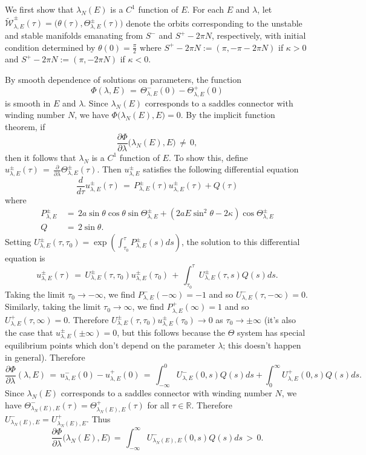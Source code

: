 \documentclass[11 pt]{article}
\renewcommand\l{\lambda}
\renewcommand\({\left(}
\renewcommand\){\right)}
\newcommand\wt{\widetilde}
\newcommand\<{\langle}
\renewcommand\>{\rangle}
\renewcommand\l{\lambda}
\newcommand\8{\infty}
\newcommand{\R}{\mathbb R}
\newcommand{\pd}{\partial}
\newcommand{\mc}{\mathcal}
\begin{document}
\proof  We first show that $\l_N(E)$ is a $C^1$ function of $E$. For each $E$ and $\l$, let $\wt{\mc{W}}_{\l,E}^\pm(\tau) = \big(\theta(\tau), \Theta^\pm_{\l,E}(\tau)\big)$ denote the orbits corresponding to the unstable and stable manifolds emanating from $S^-$ and $S^+ - 2\pi N$, respectively, with initial condition determined by $\theta(0) = \frac{\pi}{2}$ where $S^+ - 2\pi N := (\pi, - \pi - 2\pi N)$ if $\kappa > 0$ and $S^+ - 2\pi N := (\pi, -2\pi N)$ if $\kappa < 0$.

 By smooth dependence of solutions on parameters, the function 
\[
\Phi(\l,E) \,=\, \Theta^-_{\l,E}(0) - \Theta^+_{\l,E}(0)
\]
is smooth in $E$ and $\l$.  Since $\l_N(E)$ corresponds to a saddles connector with winding number $N$, we have $\Phi\big(\l_N(E),E\big) = 0$. By the implicit function theorem, if 
\[
\frac{\pd \Phi}{\pd \l}\big(\l_N(E),E\big) \,\neq\, 0,
\]
then it follows that $\l_N$ is a $C^1$ function of $E$. To show this, define $u^\pm_{\l,E}(\tau) \,=\, \frac{\pd}{\pd \l}\Theta^\pm_{\l,E}(\tau)$. Then $u^\pm_{\l,E}$ satisfies the following differential equation
\[
\frac{d}{d\tau}u^\pm_{\l,E}(\tau) \,=\, P^\pm_{\l,E}(\tau) u^\pm_{\l,E}(\tau) + Q(\tau)
\]
where
\begin{align*}
P^\pm_{\l,E} \,&=\, 2a\sin\theta \cos\theta \sin\Theta^\pm_{\l,E} + (2aE\sin^2\theta -2\kappa)\cos\Theta^\pm_{\l,E}
\\
Q \,&=\, 2\sin\theta.
\end{align*}
Setting $U^\pm_{\l,E}(\tau,\tau_0) = \exp(\int_{\tau_0}^\tau P^\pm_{\l,E}(s)ds )$, the solution to this differential equation is
\[
u^\pm_{\l,E}(\tau) \,=\, U^\pm_{\l,E}(\tau,\tau_0)u^\pm_{\l,E}(\tau_0) \,+\, \int_{\tau_0}^\tau U^\pm_{\l,E}(\tau,s)Q(s)ds. 
\]
Taking the limit $\tau_0 \to - \infty$, we find $P^-_{\l,E}(-\infty) = -1$ and so $U^-_{\l,E}(\tau,-\infty) = 0$. Similarly, taking the limit $\tau_0 \to \infty$, we find $P^+_{\l,E}(\infty) = 1$ and so $U^+_{\l,E}(\tau,\infty) = 0$. Therefore $U^\pm_{\l,E}(\tau,\tau_0) u^\pm_{\l,E}(\tau_0) \to 0$ as $\tau_0 \to \pm\infty$ (it's also the case that $u^\pm_{\l,E}(\pm \infty) = 0$, but this follows because the $\Theta$ system has special equilibrium points which don't depend on the parameter $\l$; this doesn't happen in general).  Therefore
\[
\frac{\pd \Phi}{\pd \l}(\l,E) \,=\, u^-_{\l,E}(0) - u^+_{\l,E}(0) \,=\, \int_{-\infty}^0U^-_{\l,E}(0,s)Q(s)ds + \int_0^\infty U^+_{\l,E}(0,s)Q(s)ds. 
\]
Since $\l_N(E)$ corresponds to a saddles connector with winding number $N$, we have $\Theta^-_{\l_N(E),E}(\tau) = \Theta^+_{\l_N(E),E}(\tau)$ for all $\tau \in \R$. Therefore $U^-_{\l_N(E),E} = U^+_{\l_N(E),E}$. Thus
\[
\frac{\pd \Phi}{\pd \l}\big(\l_N(E),E\big) \,=\, \int_{-\infty}^\infty U^-_{ \l_N(E),E}(0,s)Q(s)ds \,>\, 0.
\]
\end{document}
